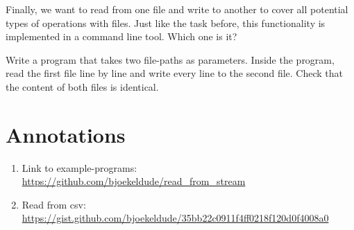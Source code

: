 \documentclass{dcbl/challenge}
\begin{document}
\begin{aufgabe}
    Finally, we want to read from one file and write to another to cover all potential types of operations with files. Just like the task before, this functionality is implemented in a command line tool. Which one is it?
    
    Write a program that takes two file-paths as parameters.
    Inside the program, read the first file line by line and write every line to the second file. Check that the content of both files is identical.
\end{aufgabe}


\section*{Annotations}
\begin{enumerate}
    \item Link to example-programs: \url{https://github.com/bjoekeldude/read_from_stream}
    \item Read from csv: \url{https://gist.github.com/bjoekeldude/35bb22c0911f4ff0218f120d0f4008a0}
\end{enumerate}
\end{document}
